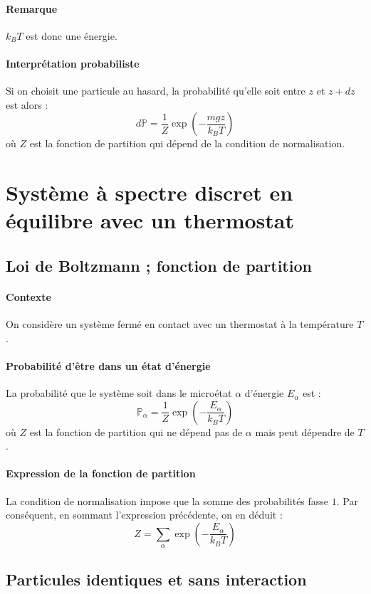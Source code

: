 \documentclass[french]{book}
\theoremstyle{plain}
\theoremstyle{definition}
\theoremstyle{remark}
\renewcommand{\P}{\mathbb{P}}
\begin{document}
\paragraph{Remarque} $k_B T$ est donc une énergie.

\paragraph{Interprétation probabiliste} Si on choisit une particule au hasard, la probabilité qu'elle soit entre $z$ et $z+dz$ est alors : $$d\P=\frac{1}{Z}\exp\left(-\frac{mgz}{k_BT}\right)$$ où $Z$ est la fonction de partition qui dépend de la condition de normalisation.

\section{Système à spectre discret en équilibre avec un thermostat}

\subsection{Loi de Boltzmann ; fonction de partition}

\paragraph{Contexte} On considère un système fermé en contact avec un thermostat à la température $T$.

\paragraph{Probabilité d'être dans un état d'énergie} La probabilité que le système soit dans le microétat $\alpha$ d'énergie $E_\alpha$ est : $$\P_\alpha=\frac{1}{Z}\exp\left(-\frac{E_\alpha}{k_B T}\right)$$ où $Z$ est la fonction de partition qui ne dépend pas de $\alpha$ mais peut dépendre de $T$.

\paragraph{Expression de la fonction de partition} La condition de normalisation impose que la somme des probabilités fasse $1$. Par conséquent, en sommant l'expression précédente, on en déduit : $$Z=\sum_\alpha\exp\left(-\frac{E_\alpha}{k_B T}\right)$$

\subsection{Particules identiques et sans interaction}
\end{document}
